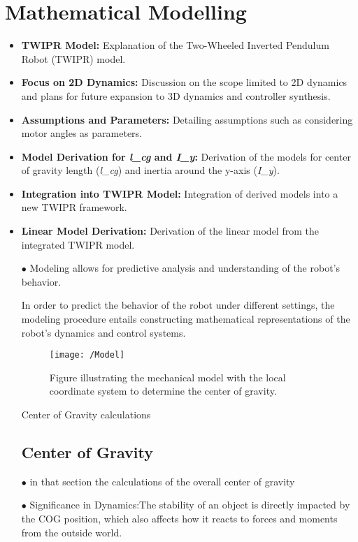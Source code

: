 \section{Mathematical Modelling}
\begin{itemize}
	\item \textbf{TWIPR Model:} Explanation of the Two-Wheeled Inverted Pendulum Robot (TWIPR) model.
	\item \textbf{Focus on 2D Dynamics:} Discussion on the scope limited to 2D dynamics and plans for future expansion to 3D dynamics and controller synthesis.
	\item \textbf{Assumptions and Parameters:} Detailing assumptions such as considering motor angles as parameters.
	\item \textbf{Model Derivation for \textit{l\_cg} and \textit{I\_y}:} Derivation of the models for center of gravity length (\textit{l\_cg}) and inertia around the y-axis (\textit{I\_y}).
	\item \textbf{Integration into TWIPR Model:} Integration of derived models into a new TWIPR framework.
	\item \textbf{Linear Model Derivation:} Derivation of the linear model from the integrated TWIPR model.
	
	$\bullet$ Modeling allows for predictive analysis and understanding of the robot's behavior.
	
	In order to predict the behavior of the robot under different settings, the modeling procedure entails constructing mathematical representations of the robot's dynamics and control systems.
	
	
	
	\begin{figure}[h]
		\centering
		\texttt{[image: /Model]}
		\caption[Mechanical model with the local coordinate system]{Figure illustrating the mechanical model with the local coordinate system to determine the center of gravity.}
		\label{Mechanical model with the local coordinate system}
	\end{figure}
	
	Center of Gravity calculations 
	\subsection{Center of Gravity } 
	$\bullet$ in that section the calculations of the overall center of gravity 
	
	$\bullet$ Significance in Dynamics:The stability of an object is directly impacted by the COG position, which also affects how it reacts to forces and moments from the outside world.
	

\end{itemize}
